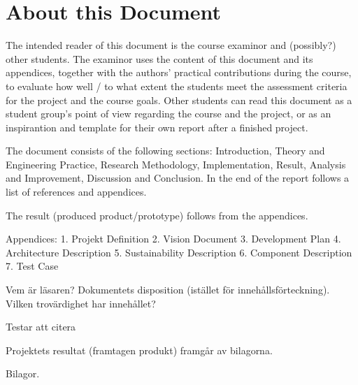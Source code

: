 \section{About this Document}
The intended reader of this document is the course examinor and (possibly?) other students. The examinor uses the content of this document and its appendices, together with the authors' practical contributions during the course, to evaluate how well / to what extent the students meet the assessment criteria for the project and the course goals. Other students can read this document as a student group's point of view regarding the course and the project, or as an inspirantion and template for their own report after a finished project. 

The document consists of the following sections: Introduction, Theory and Engineering Practice, Research Methodology, Implementation, Result, Analysis and Improvement, Discussion and Conclusion. In the end of the report follows a list of references and appendices. 

The result (produced product/prototype) follows from the appendices. 

Appendices: 
1. Projekt Definition 
2. Vision Document 
3. Development Plan
4. Architecture Description
5. Sustainability Description 
6. Component Description 
7. Test Case 



Vem är läsaren? Dokumentets disposition (istället för innehållsförteckning). Vilken trovärdighet har innehållet?

Testar att citera \cite{eklund_arbeta_2010}

Projektets resultat (framtagen produkt) framgår av bilagorna.

Bilagor.
